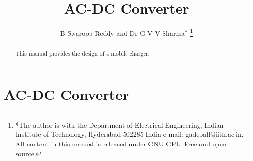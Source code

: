 \documentclass[journal,12pt,twocolumn]{IEEEtran}
\begin{document}
\let\StandardTheFigure\thefigure
\renewcommand{\thefigure}{\theproblem}



\makeatletter
{}
\makeatother

\let\StandardTheFigure\thefigure
\let\StandardTheTable\thetable





\def\putbox#1#2#3{\makebox[0in][l]{\makebox[#1][l]{}\raisebox{\baselineskip}[0in][0in]{\raisebox{#2}[0in][0in]{#3}}}}
     \def\rightbox#1{\makebox[0in][r]{#1}}
     \def\centbox#1{\makebox[0in]{#1}}
     \def\topbox#1{\raisebox{-\baselineskip}[0in][0in]{#1}}
     \def\midbox#1{\raisebox{-0.5\baselineskip}[0in][0in]{#1}}

\vspace{3cm}

\title{ 
AC-DC Converter
}

\author{B Swaroop Reddy and Dr G V V Sharma$^{*}$%
	\thanks{*The author is with the Department
		of Electrical Engineering, Indian Institute of Technology, Hyderabad
		502285 India e-mail:  gadepall@iith.ac.in. All content in this manual is released under GNU GPL.  Free and open source.}
	
}	

\maketitle

\tableofcontents
\bigskip

\begin{abstract}
	
	This manual provides the design of a mobile charger.
	
\end{abstract}

\section{AC-DC Converter}
\end{document}
